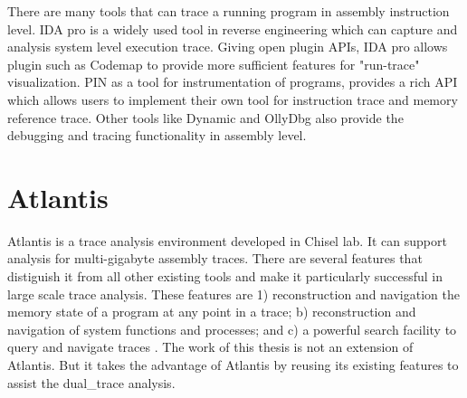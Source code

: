 There are many tools that can trace a running program in assembly instruction level.  IDA pro \cite{eagle_ida_2008} is a widely used tool in reverse engineering which can capture and analysis system level execution trace. Giving open plugin APIs, IDA pro allows plugin such as Codemap \cite{_c0demap/codemap:_????} to provide more sufficient features for "run-trace" visualization. PIN\cite{_pin_????} as a tool for instrumentation of programs, provides a rich API which allows users to implement their own tool for instruction trace and memory reference trace. Other tools like Dynamic \cite{brueningqz} and OllyDbg\cite{yuschuk2007ollydbg} also provide the debugging and tracing functionality in assembly level. 

\section{Atlantis}
Atlantis is a trace analysis environment developed in Chisel lab. It can support analysis for multi-gigabyte assembly traces. There are several features that distiguish it from all other existing tools and make it particularly successful in large scale trace analysis. These features are 1) reconstruction and navigation the memory state of a program at any point in a trace; b) reconstruction and navigation of system functions and processes; and c) a powerful search facility to query and navigate traces \cite{huang2017atlantis}. The work of this thesis is not an extension of Atlantis. But it takes the advantage of Atlantis by reusing its existing features to assist the dual\_trace analysis.




